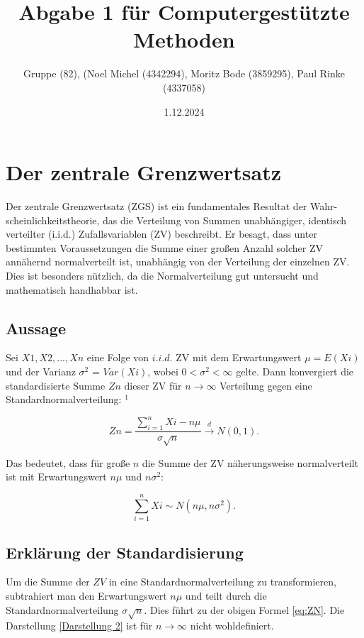 \documentclass{article}
\title{Abgabe 1 für Computergestützte Methoden}
\author{Gruppe (82), (Noel Michel (4342294), Moritz Bode (3859295), Paul Rinke (4337058)}
\date{1.12.2024}
\begin{document}
\maketitle
\tableofcontents

\newpage

\section{Der zentrale Grenzwertsatz}
Der zentrale Grenzwertsatz (ZGS) ist ein fundamentales Resultat der Wahr-
scheinlichkeitstheorie, das die Verteilung von Summen unabhängiger, identisch
verteilter (i.i.d.) Zufallsvariablen (ZV) beschreibt. Er besagt, dass unter 
bestimmten Voraussetzungen die Summe einer großen Anzahl solcher ZV annähernd
normalverteilt ist, unabhängig von der Verteilung der einzelnen ZV. Dies ist 
besonders nützlich, da die Normalverteilung gut untersucht und mathematisch
handhabbar ist.

\subsection{Aussage}
Sei $X1,X2,...,Xn$ eine Folge von $i.i.d.$ ZV mit dem Erwartungswert $\mu= E(Xi)$
und der Varianz $\sigma^2$ = $Var(Xi)$, wobei $0 < \sigma^2 < \infty$   gelte. Dann konvergiert die standardisierte Summe $Zn$ dieser ZV für $n\to\infty$ Verteilung gegen eine Standardnormalverteilung: $^1$
 
     
\begin{equation}
\label{eq:ZN}
 Zn=\frac{\sum_{i=1}^nXi-n\mu}{\sigma\sqrt{n}}\overset{d}{\longrightarrow} N(0,1).   
\end{equation}  

\noindent Das bedeutet, dass für große $n$ die Summe der ZV näherungsweise normalverteilt ist mit Erwartungswert $n\mu$ und $n\sigma^2$:

\begin{equation}
\label{Darstellung 2}
\sum_{i=1}^n Xi\sim N(n\mu,n\sigma^2).    
\end{equation}

 

\subsection{Erklärung der Standardisierung}

Um die Summe der $ZV$ in eine Standardnormalverteilung zu transformieren, subtrahiert man den Erwartungswert $n\mu$ und teilt durch die Standardnormalverteilung $\sigma\sqrt{n}$. Dies führt zu der obigen Formel \eqref{eq:ZN}. Die Darstellung \eqref{Darstellung 2} ist  für $n \to\infty$ nicht wohldefiniert. 
\end{document}
